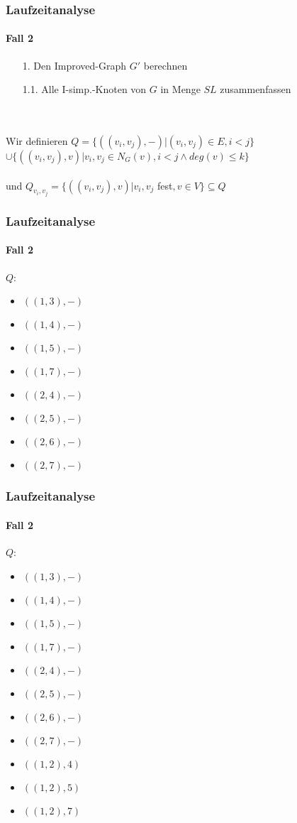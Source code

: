 
\begin{frame}
\frametitle{Laufzeitanalyse}
\framesubtitle{Fall 2}

\begin{enumerate}
	\item[1.] Den Improved-Graph $G'$ berechnen
	\item[1.1.] Alle I-simp.-Knoten von $G$ in Menge $SL$ zusammenfassen
\end{enumerate}
\ \\
\ \\

Wir definieren $Q = \{ ((v_i, v_j), - ) | (v_i, v_j) \in E, i < j \}$ \\
\hspace{2.86cm}$\cup \{ ((v_i, v_j), v) | v_i, v_j \in N_G(v), i < j \wedge deg(v) \leq k\}$ \\
\ \\
und $Q_{v_i,v_j} = \{ ((v_i, v_j), v) | v_i, v_j$ fest$, v \in V \} \subseteq Q$ \\

\end{frame}


\begin{frame}
\frametitle{Laufzeitanalyse}
\framesubtitle{Fall 2}
$Q$:
\begin{itemize}
	\item $((1,3), -)$
	\item $((1,4), -)$
	\item $((1,5), -)$
	\item $((1,7), -)$
	\item $((2,4), -)$
	\item $((2,5), -)$
	\item $((2,6), -)$
	\item $((2,7), -)$
\end{itemize}
\end{frame}

\begin{frame}
\frametitle{Laufzeitanalyse}
\framesubtitle{Fall 2}
\begin{minipage}{0.5\textwidth}
	$Q$:
	\begin{itemize}
		\item $((1,3), -)$
		\item $((1,4), -)$
		\item $((1,5), -)$
		\item $((1,7), -)$
		\item $((2,4), -)$
		\item $((2,5), -)$
		\item $((2,6), -)$
		\item $((2,7), -)$
		
		\item $((1,2), 4)$
		\item $((1,2), 5)$
		\item $((1,2), 7)$
	\end{itemize}
\end{minipage}

\begin{minipage}{0.5\textwidth}
	
\end{minipage}
\end{frame}


